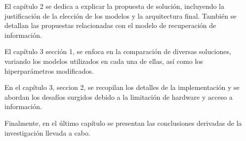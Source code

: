 El cap\'itulo 2 se dedica a explicar la propuesta de soluci\'on, incluyendo la justificaci\'on de la elecci\'on de los modelos y la arquitectura final. Tambi\'en se detallan las propuestas relacionadas con el modelo de recuperaci\'on de informaci\'on.

El cap\'itulo 3 secci\'on 1, se enfoca en la comparaci\'on de diversas soluciones, variando los modelos utilizados en cada una de ellas, as\'i como los hiperpar\'ametros modificados.

En el cap\'itulo 3, seccion 2, se recopilan los detalles de la implementaci\'on y se abordan los desaf\'ios surgidos debido a la limitaci\'on de hardware y acceso a informaci\'on.

Finalmente, en el \'ultimo cap\'itulo se presentan las conclusiones derivadas de la investigaci\'on llevada a cabo.

